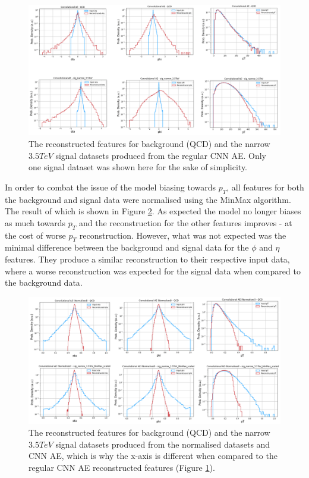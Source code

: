 \documentclass[a4paper]{article}
\theoremstyle{plain}
\theoremstyle{definition}
\begin{document}
    		\begin{figure}[H]
				\centering
				\begin{minipage}[b]{\linewidth}
					\centering
					\includegraphics[width=\textwidth]{cnn.png}
					\caption{The reconstructed features for background (QCD) and the narrow $3.5 TeV$ signal datasets produced from the regular CNN AE. Only one signal dataset was shown here for the sake of simplicity.}
					\label{fig:cnn-reconstructed}
				\end{minipage}
			\end{figure}

			In order to combat the issue of the model biasing towards $p_T$, all features for both the background and signal data were normalised using the MinMax algorithm. The result of which is shown in Figure \ref{fig:cnn-recontructed-norm}. As expected the model no longer biases as much towards $p_T$ and the reconstruction for the other features improves - at the cost of worse $p_T$ reconstruction. However, what was not expected was the minimal difference between the background and signal data for the $\phi$ and $\eta$ features. They produce a similar reconstruction to their respective input data, where a worse reconstruction was expected for the signal data when compared to the background data. 

    		\begin{figure}[H]
				\centering
				\begin{minipage}[b]{\linewidth}
					\centering
					\includegraphics[width=\textwidth]{cnn-norm.png}
					\caption{The reconstructed features for background (QCD) and the narrow $3.5 TeV$ signal datasets produced from the normalised datasets and CNN AE, which is why the x-axis is different when compared to the regular CNN AE reconstructed features (Figure \ref{fig:cnn-reconstructed}).}
					\label{fig:cnn-recontructed-norm}
				\end{minipage}
			\end{figure}
\end{document}
